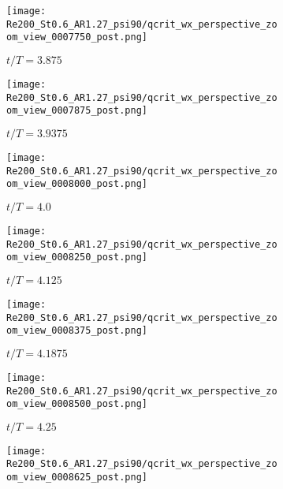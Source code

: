 \begin{figure}[H]
  \centering
  \begin{subfigure}[b]{0.3\textwidth}
    \centering
    \texttt{[image: Re200\_St0.6\_AR1.27\_psi90/qcrit\_wx\_perspective\_zoom\_view\_0007750\_post.png]}
    \caption{$t / T = 3.875$}
    \label{fig:baseline_qcrit_perspective:0007750}
  \end{subfigure}
  \hspace{0.5em}
  \begin{subfigure}[b]{0.3\textwidth}
    \centering
    \texttt{[image: Re200\_St0.6\_AR1.27\_psi90/qcrit\_wx\_perspective\_zoom\_view\_0007875\_post.png]}
    \caption{$t / T = 3.9375$}
    \label{fig:baseline_qcrit_perspective:0007875}
  \end{subfigure}
  \hspace{0.5em}
  \begin{subfigure}[b]{0.3\textwidth}
    \centering
    \texttt{[image: Re200\_St0.6\_AR1.27\_psi90/qcrit\_wx\_perspective\_zoom\_view\_0008000\_post.png]}
    \caption{$t / T = 4.0$}
    \label{fig:baseline_qcrit_perspective:0008000}
  \end{subfigure}
  \vspace{0.5em}
  \begin{subfigure}[b]{0.3\textwidth}
    \centering
    \texttt{[image: Re200\_St0.6\_AR1.27\_psi90/qcrit\_wx\_perspective\_zoom\_view\_0008250\_post.png]}
    \caption{$t / T = 4.125$}
    \label{fig:baseline_qcrit_perspective:0008250}
  \end{subfigure}
  \hspace{0.5em}
  \begin{subfigure}[b]{0.3\textwidth}
    \centering
    \texttt{[image: Re200\_St0.6\_AR1.27\_psi90/qcrit\_wx\_perspective\_zoom\_view\_0008375\_post.png]}
    \caption{$t / T = 4.1875$}
    \label{fig:baseline_qcrit_perspective:0008375}
  \end{subfigure}
  \hspace{0.5em}
  \begin{subfigure}[b]{0.3\textwidth}
    \centering
    \texttt{[image: Re200\_St0.6\_AR1.27\_psi90/qcrit\_wx\_perspective\_zoom\_view\_0008500\_post.png]}
    \caption{$t / T = 4.25$}
    \label{fig:baseline_qcrit_perspective:0008500}
  \end{subfigure}
  \vspace{0.5em}
  \begin{subfigure}[b]{0.3\textwidth}
    \centering
    \texttt{[image: Re200\_St0.6\_AR1.27\_psi90/qcrit\_wx\_perspective\_zoom\_view\_0008625\_post.png]}

\end{subfigure}
\end{figure}
